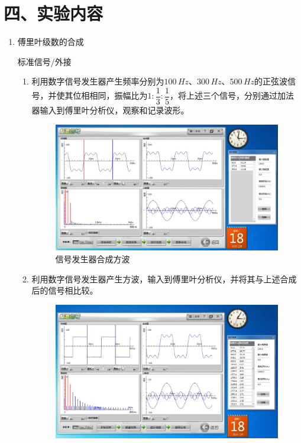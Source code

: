 \documentclass[11pt]{article}
\begin{document}
\section*{四、实验内容}

\begin{enumerate}
    \item 傅里叶级数的合成
    
    \begin{center}
        \Large{标准信号/外接}
    \end{center}
    
    \begin{enumerate}
        \item 利用数字信号发生器产生频率分别为$100\,Hz$、$300\,Hz$、$500\,Hz$的正弦波信号，并使其位相相同，振幅比为$1:\dfrac{1}{3}:\dfrac{1}{5}$，将上述三个信号，分别通过加法器输入到傅里叶分析仪，观察和记录波形。
        \begin{figure}[H]
            \centering
            \includegraphics[width=15cm]{Fig/图1 信号发生器合成方波.JPG}
            \caption{信号发生器合成方波}
        \end{figure}
        \item 利用数字信号发生器产生方波，输入到傅里叶分析仪，并将其与上述合成后的信号相比较。
        \begin{figure}[H]
            \centering
            \includegraphics[width=15cm]{Fig/图2 信号发生器输出方波.JPG}

\end{figure}
\end{enumerate}
\end{enumerate}
\end{document}
